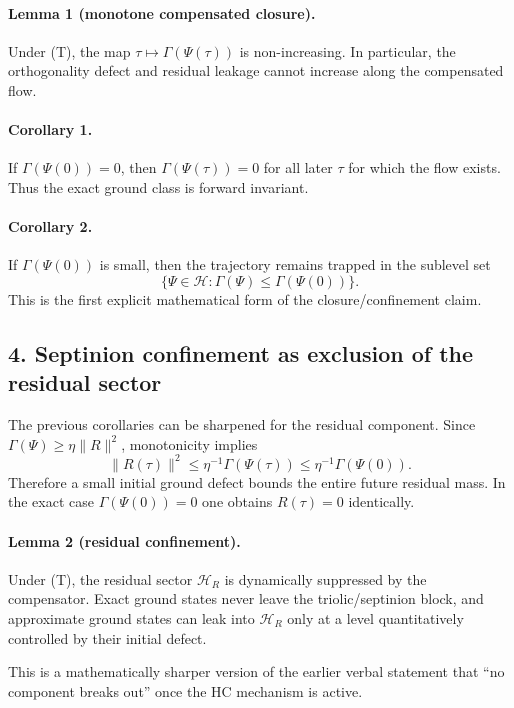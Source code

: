 \paragraph{Lemma 1 (monotone compensated closure).}
Under \textup{(T)}, the map $\tau\mapsto \Gamma(\Psi(\tau))$ is non-increasing. In
particular, the orthogonality defect and residual leakage cannot increase along
the compensated flow.

\paragraph{Corollary 1.}
If $\Gamma(\Psi(0))=0$, then $\Gamma(\Psi(\tau))=0$ for all later $\tau$ for which
the flow exists. Thus the exact ground class is forward invariant.

\paragraph{Corollary 2.}
If $\Gamma(\Psi(0))$ is small, then the trajectory remains trapped in the
sublevel set
\[
\{\Psi\in\mathcal H: \Gamma(\Psi)\le \Gamma(\Psi(0))\}.
\]
This is the first explicit mathematical form of the closure/confinement claim.

\subsection*{4. Septinion confinement as exclusion of the residual sector}
The previous corollaries can be sharpened for the residual component. Since
$\Gamma(\Psi)\ge \eta\|R\|^2$, monotonicity implies
\[
\|R(\tau)\|^2 \le \eta^{-1}\Gamma(\Psi(\tau)) \le \eta^{-1}\Gamma(\Psi(0)).
\]
Therefore a small initial ground defect bounds the entire future residual mass.
In the exact case $\Gamma(\Psi(0))=0$ one obtains $R(\tau)=0$ identically.

\paragraph{Lemma 2 (residual confinement).}
Under \textup{(T)}, the residual sector $\mathcal H_R$ is dynamically suppressed by
the compensator. Exact ground states never leave the triolic/septinion block,
and approximate ground states can leak into $\mathcal H_R$ only at a level
quantitatively controlled by their initial defect.

This is a mathematically sharper version of the earlier verbal statement that
``no component breaks out'' once the HC mechanism is active.

